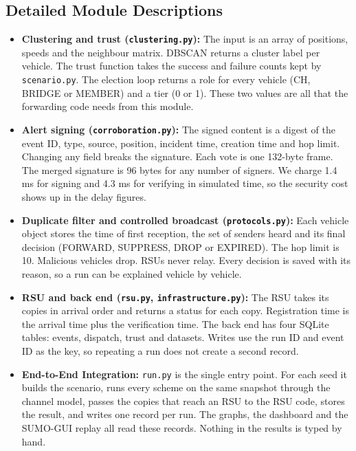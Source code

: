 \documentclass[11pt, a4paper]{article}
\begin{document}
\subsection{Detailed Module Descriptions}
\begin{itemize}[noitemsep, topsep=2pt]
    \item \textbf{Clustering and trust (\texttt{clustering.py}):} The input is an array of positions, speeds and the neighbour matrix. DBSCAN returns a cluster label per vehicle. The trust function takes the success and failure counts kept by \texttt{scenario.py}. The election loop returns a role for every vehicle (CH, BRIDGE or MEMBER) and a tier (0 or 1). These two values are all that the forwarding code needs from this module.
    \item \textbf{Alert signing (\texttt{corroboration.py}):} The signed content is a digest of the event ID, type, source, position, incident time, creation time and hop limit. Changing any field breaks the signature. Each vote is one 132-byte frame. The merged signature is 96 bytes for any number of signers. We charge 1.4 ms for signing and 4.3 ms for verifying in simulated time, so the security cost shows up in the delay figures.
    \item \textbf{Duplicate filter and controlled broadcast (\texttt{protocols.py}):} Each vehicle object stores the time of first reception, the set of senders heard and its final decision (FORWARD, SUPPRESS, DROP or EXPIRED). The hop limit is 10. Malicious vehicles drop. RSUs never relay. Every decision is saved with its reason, so a run can be explained vehicle by vehicle.
    \item \textbf{RSU and back end (\texttt{rsu.py}, \texttt{infrastructure.py}):} The RSU takes its copies in arrival order and returns a status for each copy. Registration time is the arrival time plus the verification time. The back end has four SQLite tables: events, dispatch, trust and datasets. Writes use the run ID and event ID as the key, so repeating a run does not create a second record.
    \item \textbf{End-to-End Integration:} \texttt{run.py} is the single entry point. For each seed it builds the scenario, runs every scheme on the same snapshot through the channel model, passes the copies that reach an RSU to the RSU code, stores the result, and writes one record per run. The graphs, the dashboard and the SUMO-GUI replay all read these records. Nothing in the results is typed by hand.
\end{itemize}
\end{document}

